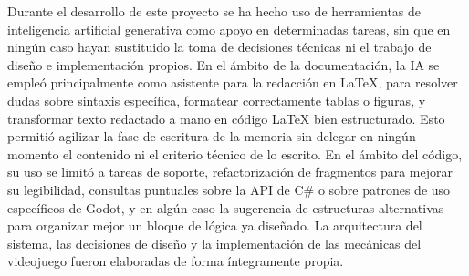 Durante el desarrollo de este proyecto se ha hecho uso de herramientas de inteligencia
artificial generativa como apoyo en determinadas tareas, sin que en ningún caso hayan
sustituido la toma de decisiones técnicas ni el trabajo de diseño e implementación
propios. En el ámbito de la documentación, la IA se empleó principalmente como
asistente para la redacción en \LaTeX{}, para resolver dudas sobre sintaxis específica,
formatear correctamente tablas o figuras, y transformar texto redactado a mano en
código \LaTeX{} bien estructurado. Esto permitió agilizar la fase de escritura de la
memoria sin delegar en ningún momento el contenido ni el criterio técnico de lo
escrito. En el ámbito del código, su uso se limitó a tareas de soporte, refactorización
de fragmentos para mejorar su legibilidad, consultas puntuales sobre la API de C\# o
sobre patrones de uso específicos de Godot, y en algún caso la sugerencia de
estructuras alternativas para organizar mejor un bloque de lógica ya diseñado. La
arquitectura del sistema, las decisiones de diseño y la implementación de las mecánicas
del videojuego fueron elaboradas de forma íntegramente propia.

